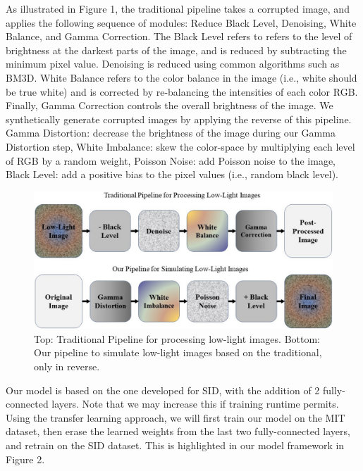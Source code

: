 \documentclass{article}
\begin{document}
As illustrated in Figure 1, the traditional pipeline takes a corrupted image, and applies the following sequence of modules: Reduce Black Level, Denoising, White Balance, and Gamma Correction. The Black Level refers to refers to the level of brightness at the darkest parts of the image, and is reduced by subtracting the minimum pixel value. Denoising is reduced using common algorithms such as BM3D. White Balance refers to the color balance in the image (i.e., white should be true white) and is corrected by re-balancing the intensities of each color RGB. Finally, Gamma Correction controls the overall brightness of the image. We synthetically generate corrupted images by applying the reverse of this pipeline. Gamma Distortion: decrease the brightness of the image during our Gamma Distortion step, White Imbalance: skew the color-space by multiplying each level of RGB by a random weight, Poisson Noise: add Poisson noise to the image, Black Level: add a positive bias to the pixel values (i.e., random black level). 

\begin{figure}[ht]
  \centering
  \includegraphics[scale=0.35]{pipeline.jpg}
  \caption{Top: Traditional Pipeline for processing low-light images. Bottom: Our  pipeline to simulate low-light images based on the traditional, only in reverse.}
\end{figure}


Our model is based on the one developed for SID, with the addition of 2 fully-connected layers. Note that we may increase this if training runtime permits. Using the transfer learning approach, we will first train our model on the MIT dataset, then erase the learned weights from the last two fully-connected layers, and retrain on the SID dataset. This is highlighted in our model framework in Figure 2. 
\end{document}
